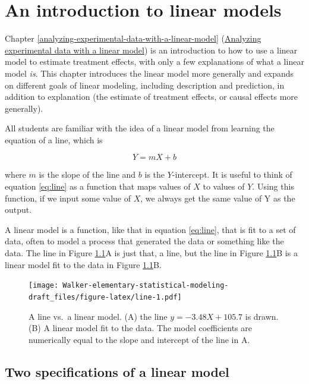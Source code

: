 \documentclass[]{book}
\begin{document}
\hypertarget{an-introduction-to-linear-models}{%
\chapter{An introduction to linear models}\label{an-introduction-to-linear-models}}

Chapter \ref{analyzing-experimental-data-with-a-linear-model} (\protect\hyperlink{analyzing-experimental-data-with-a-linear-model}{Analyzing experimental data with a linear model}) is an introduction to how to use a linear model to estimate treatment effects, with only a few explanations of what a linear model \emph{is}. This chapter introduces the linear model more generally and expands on different goals of linear modeling, including description and prediction, in addition to explanation (the estimate of treatment effects, or causal effects more generally).

All students are familiar with the idea of a linear model from learning the equation of a line, which is

\begin{equation}
Y = mX + b
\label{eq:line}
\end{equation}

where \(m\) is the slope of the line and \(b\) is the \(Y\)-intercept. It is useful to think of equation \eqref{eq:line} as a function that maps values of \(X\) to values of \(Y\). Using this function, if we input some value of \(X\), we always get the same value of Y as the output.

A linear model is a function, like that in equation \eqref{eq:line}, that is fit to a set of data, often to model a process that generated the data or something like the data. The line in Figure \ref{fig:line}A is just that, a line, but the line in Figure \ref{fig:line}B is a linear model fit to the data in Figure \ref{fig:line}B.

\begin{figure}
\centering
\texttt{[image: Walker-elementary-statistical-modeling-draft\_files/figure-latex/line-1.pdf]}
\caption{\label{fig:line}A line vs.~a linear model. (A) the line \(y=-3.48X + 105.7\) is drawn. (B) A linear model fit to the data. The model coefficients are numerically equal to the slope and intercept of the line in A.}
\end{figure}

\hypertarget{two-specifications-of-a-linear-model}{%
\section{Two specifications of a linear model}\label{two-specifications-of-a-linear-model}}
\end{document}
